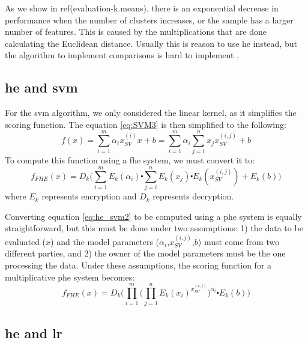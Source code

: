 As we show in ref(evaluation-k.means), there is an exponential decrease in performance when the number of clusters increases, or the sample has a larger number of features. This is caused by the multiplications that are done calculating the Euclidean distance. Usually this is reason to use \ac{he} instead, but the algorithm to implement comparisons is hard to implement \cite{blake2004strong}.



\subsection{\acl{he} and \acl{svm}}
\label{ssec:HEandSVM}

For the \ac{svm} algorithm, we only considered the linear kernel, as it simplifies the scoring function. The equation \ref{eq:SVM3} is then simplified to the following:
\begin{equation}
\label{eq:he_svm1}
f(x)=\sum_{i=1}^m \alpha_i x_{SV}^{(i)}x+b = \sum_{i=1}^m \alpha_i \sum_{j=1}^n x_j x_{SV}^{(i,j)} + b
\end{equation}
To compute this function using a \ac{fhe} system, we must convert it to:
\begin{equation}
\label{eq:he_svm2}
f_{FHE}(x) = D_k\Bigg( \sum_{i=1}^m E_k(\alpha_i) \centerdot \sum_{j=i}^n E_k(x_j) \centerdot E_k(x_{SV}^{(i,j)}) + E_k(b)\Bigg)
\end{equation}
where $E_k$ represents encryption and $D_k$ represents decryption.

Converting equation \ref{eq:he_svm2} to be computed using a \ac{phe} system is equally straightforward, but this must be done under two assumptions: 1) the data to be evaluated ($x$) and the model parameters ($\alpha_i$,$x_{SV}^{(i,j)}$,$b$) must come from two different parties, and 2) the owner of the model parameters must be the one processing the data. Under these assumptions, the scoring function for a multiplicative \ac{phe} system becomes:
\begin{equation}
\label{eq:he_svm3}
f_{FHE}(x) = D_k\Bigg( \prod_{i=1}^m \bigg(\prod_{j=1}^n E_k(x_i)^{x_{SV}^{(i,j)}} \bigg)^{\alpha_i} \centerdot E_k(b) \Bigg)
\end{equation}

\subsection{\acl{he} and \acl{lr}}
\label{ssec:HEandLR}

